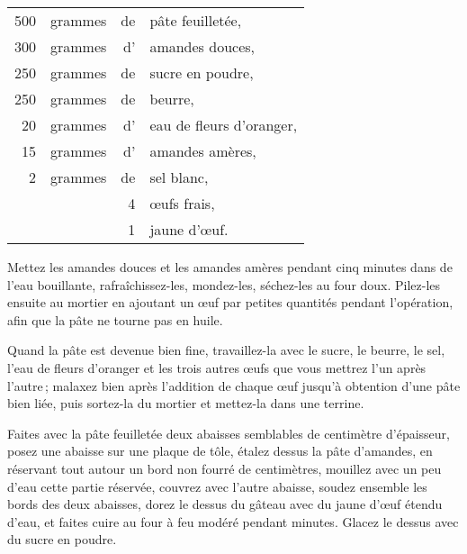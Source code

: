 \footnotesize
\begin{longtable}{rrrp{16em}}
    500 & grammes & de & pâte feuilletée,                                                                 \\
    300 & grammes & d' & amandes douces,                                                                  \\
    250 & grammes & de & sucre en poudre,                                                                 \\
    250 & grammes & de & beurre,                                                                          \\
     20 & grammes & d' & eau de fleurs d'oranger,                                                         \\
     15 & grammes & d' & amandes amères,                                                                  \\
      2 & grammes & de & sel blanc,                                                                       \\
        &         &  4 & œufs frais,                                                                      \\
        &         &  1 & jaune d'œuf.                                                                     \\
\end{longtable}
\normalsize

 Mettez les amandes douces et les amandes amères pendant cinq minutes dans de
 l'eau bouillante, rafraîchissez-les, mondez-les, séchez-les au four doux.
 Pilez-les ensuite au mortier en ajoutant un œuf par petites quantités pendant
 l'opération, afin que la pâte ne tourne pas en huile.

Quand la pâte est devenue bien fine, travaillez-la avec le sucre, le beurre, le
sel, l'eau de fleurs d'oranger et les trois autres œufs que vous mettrez l'un
après l'autre ; malaxez bien après l'addition de chaque œuf jusqu'à obtention
d'une pâte bien liée, puis sortez-la du mortier et mettez-la dans une terrine.

Faites avec la pâte feuilletée deux abaisses semblables de {\mmm}
centimètre d'épaisseur, posez une abaisse sur une plaque de tôle, étalez dessus
la pâte d'amandes, en réservant tout autour un bord non fourré de {\mmm}
centimètres, mouillez avec un peu d’eau cette partie réservée, couvrez avec
l'autre abaisse, soudez ensemble les bords des deux abaisses, dorez le dessus
du gâteau avec du jaune d'œuf étendu d'eau, et faites cuire au four à feu
modéré pendant {\mmm} minutes. Glacez le dessus avec du sucre en poudre.

